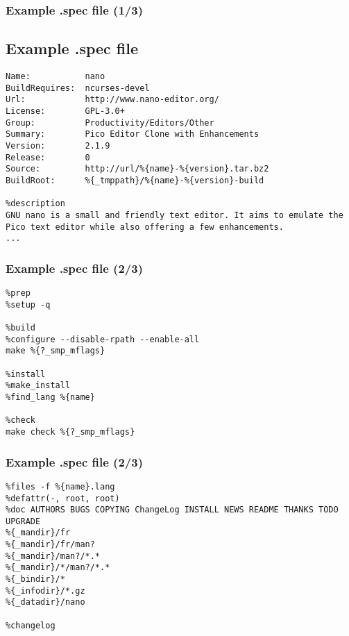 \begin{frame}[fragile,t]
	\frametitle{Example .spec file (1/3)}
	\subsection{Example .spec file}
	\begin{small}
	\begin{verbatim}
Name:           nano  
BuildRequires:  ncurses-devel  
Url:            http://www.nano-editor.org/  
License:        GPL-3.0+
Group:          Productivity/Editors/Other  
Summary:        Pico Editor Clone with Enhancements  
Version:        2.1.9  
Release:        0
Source:         http://url/%{name}-%{version}.tar.bz2  
BuildRoot:      %{_tmppath}/%{name}-%{version}-build  

%description  
GNU nano is a small and friendly text editor. It aims to emulate the  
Pico text editor while also offering a few enhancements.
...

	\end{verbatim}
	\end{small}
\end{frame}
\begin{frame}[fragile,t]
	\frametitle{Example .spec file (2/3)}
	\begin{small}
	\begin{verbatim}
%prep  
%setup -q 
 
%build  
%configure --disable-rpath --enable-all  
make %{?_smp_mflags} 
  
%install  
%make_install  
%find_lang %{name}
  
%check  
make check %{?_smp_mflags}

	\end{verbatim}
	\end{small}
\end{frame}
\begin{frame}[fragile,t]
	\frametitle{Example .spec file (2/3)}
	\begin{small}
	\begin{verbatim}
%files -f %{name}.lang  
%defattr(-, root, root)  
%doc AUTHORS BUGS COPYING ChangeLog INSTALL NEWS README THANKS TODO UPGRADE  
%{_mandir}/fr  
%{_mandir}/fr/man?  
%{_mandir}/man?/*.*  
%{_mandir}/*/man?/*.*  
%{_bindir}/*  
%{_infodir}/*.gz  
%{_datadir}/nano  
  
%changelog
	\end{verbatim}
	\end{small}
\end{frame}

